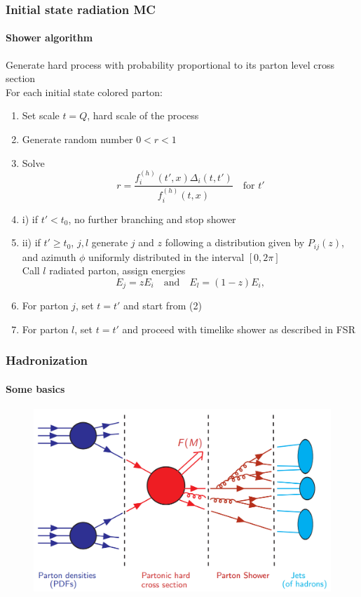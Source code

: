 \documentclass[aspectratio=43]{beamer}
\begin{document}
\begin{frame}

	\frametitle{Initial state radiation MC}
	\framesubtitle{Shower algorithm}
	
	\footnotesize Generate hard process with probability proportional to its parton level cross section \\
	\footnotesize For each initial state colored parton:
	\begin{enumerate}
		\item Set scale $t = Q$, hard scale of the process
		\item Generate random number $0 < r < 1$
		\item Solve $$r = \frac{f^{(h)}_{i}(t', x) \Delta_{i}(t, t')}{f^{(h)}_{i}(t, x)} \quad \textrm{for }t'$$
		\item \footnotesize i) if $t' < t_{0}$, no further branching and stop shower
		\item \footnotesize ii) if $t' \geq t_{0}$, $j, l$ generate $j$ and $z$ following a distribution given by  $P_{ij}(z)$, and  azimuth $\phi$ uniformly distributed in the interval $[0, 2\pi]$ \\
		Call $l$ radiated parton, assign energies $$E_{j} = zE_{i} \quad \textrm{and}\quad E_{l} = (1 - z)E_{i}, $$
		\item \footnotesize For parton $j$, set $t = t'$ and start from (2)
		\item \footnotesize For parton $l$, set $t = t'$ and proceed with timelike shower as described in FSR
	\end{enumerate}
\end{frame}

\begin{frame}
	
	\frametitle{Hadronization}
	\framesubtitle{Some basics}

	\begin{figure}
		\includegraphics[width = 6 cm]{plots/factorization_1.png}
	\end{figure}

\end{frame}
\end{document}
